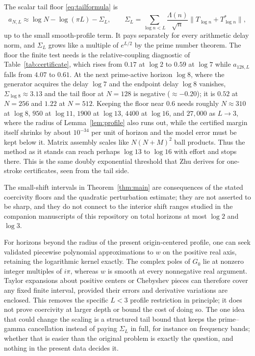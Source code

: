 \documentclass[11pt]{article}
\numberwithin{equation}{section}
\theoremstyle{definition}
\theoremstyle{remark}
\newcommand{\norm}[1]{\lVert#1\rVert}
\begin{document}
The scalar tail floor \eqref{eq:tailformula} is
\[
 a_{N,L}\approx\log N-\log(\pi L)-\Sigma_L,\qquad
 \Sigma_L=\sum_{\log n<L}\frac{\Lambda(n)}{\sqrt n}\norm{T_{\log n}+T_{\log n}^*},
\]
up to the small smooth-profile term. It pays separately for every arithmetic
delay norm, and $\Sigma_L$ grows like a multiple of $e^{L/2}$ by the prime
number theorem. The floor the finite test needs is the relative-coupling
diagnostic of Table~\ref{tab:certificate}, which rises from $0.17$ at $\log2$
to $0.59$ at $\log7$ while $a_{128,L}$ falls from $4.07$ to $0.61$. At the
next prime-active horizon $\log8$, where the generator acquires the delay
$\log7$ and the endpoint delay $\log8$ vanishes, $\Sigma_{\log8}\approx3.13$
and the tail floor at $N=128$ is negative ($\approx-0.20$); it is $0.52$ at
$N=256$ and $1.22$ at $N=512$. Keeping the floor near $0.6$ needs roughly
$N\approx310$ at $\log8$, $950$ at $\log11$, $1900$ at $\log13$, $4400$ at
$\log16$, and $27{,}000$ as $L\to3$, where the radius of Lemma~\ref{lem:profile}
also runs out, while the certified margin itself shrinks by about
$10^{-34}$ per unit of horizon and the model error must be kept below it.
Matrix assembly scales like $N(N+M)^2$ ball products. Thus the method as it
stands can reach perhaps $\log13$ to $\log16$ with effort and stops there.
This is the same doubly exponential threshold that Zhu \cite{Zhu2026} derives
for one-stroke certificates, seen from the tail side.

The small-shift intervals in Theorem~\ref{thm:main} are consequences of the
stated coercivity floors and the quadratic perturbation estimate; they are
not asserted to be sharp, and they do not connect to the interior shift
ranges studied in the companion manuscripts of this repository on total
horizons at most $\log2$ and $\log3$.

For horizons beyond the radius of the present origin-centered profile,
one can seek validated piecewise polynomial approximations to $w$ on the
positive real axis, retaining the logarithmic kernel exactly. The complex
poles of $G_0$ lie at nonzero integer multiples of $i\pi$, whereas $w$ is
smooth at every nonnegative real argument. Taylor expansions about positive
centers or Chebyshev pieces can therefore cover any fixed finite interval,
provided their errors and derivative variations are enclosed. This removes
the specific $L<3$ profile restriction in principle; it does not prove
coercivity at larger depth or bound the cost of doing so. The one idea that
could change the scaling is a structured tail bound that keeps the
prime--gamma cancellation instead of paying $\Sigma_L$ in full, for instance
on frequency bands; whether that is easier than the original problem is
exactly the question, and nothing in the present data decides it.
\end{document}
